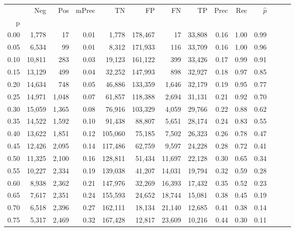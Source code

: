 \begin{tabular}{rrrrrrrrrrrrrr}
\toprule
{} &     Neg &    Pos & mPrec &       TN &       FP &      FN &      TP &  Prec &   Rec & $\hat{p}$ \\
p    &         &        &       &          &          &         &         &       &       &           \\
\midrule
0.00 &   1,778 &     17 &  0.01 &    1,778 &  178,467 &      17 &  33,808 &  0.16 &  1.00 &      0.99 \\
0.05 &   6,534 &     99 &  0.01 &    8,312 &  171,933 &     116 &  33,709 &  0.16 &  1.00 &      0.96 \\
0.10 &  10,811 &    283 &  0.03 &   19,123 &  161,122 &     399 &  33,426 &  0.17 &  0.99 &      0.91 \\
0.15 &  13,129 &    499 &  0.04 &   32,252 &  147,993 &     898 &  32,927 &  0.18 &  0.97 &      0.85 \\
0.20 &  14,634 &    748 &  0.05 &   46,886 &  133,359 &   1,646 &  32,179 &  0.19 &  0.95 &      0.77 \\
0.25 &  14,971 &  1,048 &  0.07 &   61,857 &  118,388 &   2,694 &  31,131 &  0.21 &  0.92 &      0.70 \\
0.30 &  15,059 &  1,365 &  0.08 &   76,916 &  103,329 &   4,059 &  29,766 &  0.22 &  0.88 &      0.62 \\
0.35 &  14,522 &  1,592 &  0.10 &   91,438 &   88,807 &   5,651 &  28,174 &  0.24 &  0.83 &      0.55 \\
0.40 &  13,622 &  1,851 &  0.12 &  105,060 &   75,185 &   7,502 &  26,323 &  0.26 &  0.78 &      0.47 \\
0.45 &  12,426 &  2,095 &  0.14 &  117,486 &   62,759 &   9,597 &  24,228 &  0.28 &  0.72 &      0.41 \\
0.50 &  11,325 &  2,100 &  0.16 &  128,811 &   51,434 &  11,697 &  22,128 &  0.30 &  0.65 &      0.34 \\
0.55 &  10,227 &  2,334 &  0.19 &  139,038 &   41,207 &  14,031 &  19,794 &  0.32 &  0.59 &      0.28 \\
0.60 &   8,938 &  2,362 &  0.21 &  147,976 &   32,269 &  16,393 &  17,432 &  0.35 &  0.52 &      0.23 \\
0.65 &   7,617 &  2,351 &  0.24 &  155,593 &   24,652 &  18,744 &  15,081 &  0.38 &  0.45 &      0.19 \\
0.70 &   6,518 &  2,396 &  0.27 &  162,111 &   18,134 &  21,140 &  12,685 &  0.41 &  0.38 &      0.14 \\
0.75 &   5,317 &  2,469 &  0.32 &  167,428 &   12,817 &  23,609 &  10,216 &  0.44 &  0.30 &      0.11 \\

\end{tabular}
